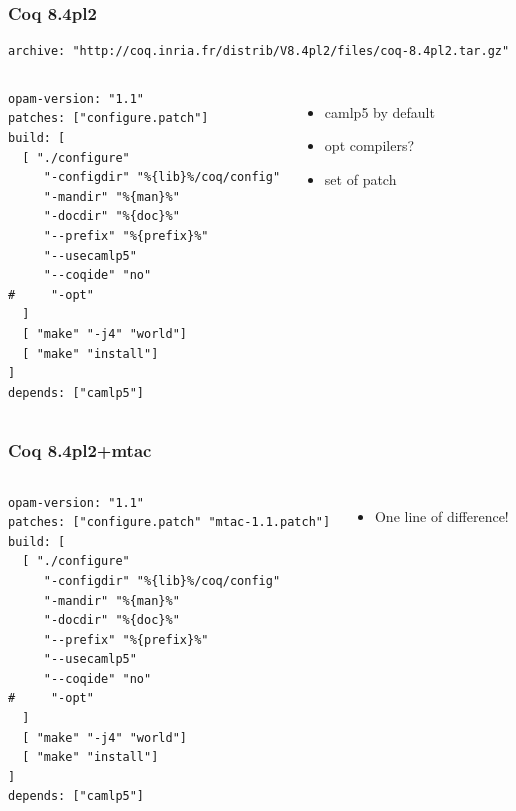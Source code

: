 \documentclass[9pt]{beamer}
\begin{document}
\begin{frame}[fragile]
  \frametitle{Coq 8.4pl2}

\lstset{basicstyle=\footnotesize, frame=single}

\begin{lstlisting}
archive: "http://coq.inria.fr/distrib/V8.4pl2/files/coq-8.4pl2.tar.gz"    
\end{lstlisting}

  \begin{columns}

  \begin{lstlisting}
opam-version: "1.1"
patches: ["configure.patch"]
build: [
  [ "./configure" 
     "-configdir" "%{lib}%/coq/config"
     "-mandir" "%{man}%"
     "-docdir" "%{doc}%"
     "--prefix" "%{prefix}%"
     "--usecamlp5"
     "--coqide" "no"
#     "-opt"
  ]
  [ "make" "-j4" "world"]
  [ "make" "install"]
]
depends: ["camlp5"]    
  \end{lstlisting}
    \begin{itemize}
    \item camlp5 by default
    \item opt compilers?
    \item set of patch
    \end{itemize}
  \end{columns}
\end{frame}

\begin{frame}[fragile]
  \frametitle{Coq 8.4pl2+mtac}
  \begin{columns}
\lstset{basicstyle=\footnotesize}
  \begin{lstlisting}
opam-version: "1.1"
patches: ["configure.patch" "mtac-1.1.patch"]
build: [
  [ "./configure" 
     "-configdir" "%{lib}%/coq/config"
     "-mandir" "%{man}%"
     "-docdir" "%{doc}%"
     "--prefix" "%{prefix}%"
     "--usecamlp5"
     "--coqide" "no"
#     "-opt"
  ]
  [ "make" "-j4" "world"]
  [ "make" "install"]
]
depends: ["camlp5"]    
  \end{lstlisting}
    \begin{itemize}
      \item One line of difference!
    \end{itemize}
  \end{columns}
\end{frame}
\end{document}
